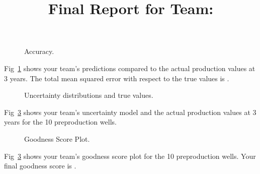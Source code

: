 \documentclass[11pt, oneside]{article}   	%
\title{Final Report for Team: \VAR{teamname}}
\date{}
\begin{document}
\maketitle

\begin{figure}[htbp] %
   \centering
   \scalebox{0.75}{}
   \caption{Accuracy.}
   \label{fig:accuracy}
\end{figure}
%
Fig~\ref{fig:accuracy} shows your team's predictions compared to the actual production values at 3 years.  The total mean squared error with respect to the true values is .

\newpage

\begin{figure}[tbph] %
   \centering
   \scalebox{0.7}{}
   \caption{Uncertainty distributions and true values.}
   \label{fig:realizations}
\end{figure}
%
Fig~\ref{fig:realizations} shows your team's uncertainty model and the actual production values at 3 years for the 10 preproduction wells.

\newpage

\begin{figure}[tbph] %
   \centering
   \scalebox{0.7}{}
   \caption{Goodness Score Plot.}
   \label{fig:realizations}
\end{figure}
%
Fig~\ref{fig:realizations} shows your team's goodness score plot for the 10 preproduction wells.  Your final goodness score is .
\end{document}
